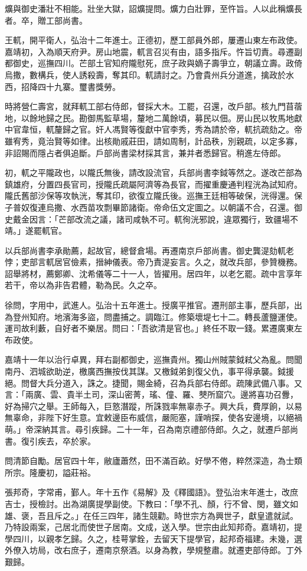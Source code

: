 \begin{pinyinscope}
爌與御史潘壯不相能。壯坐大獄，詔爌提問。爌力白壯罪，至忤旨。人以此稱爌長者。卒，贈工部尚書。

王軏，開平衛人，弘治十二年進士。正德初，歷工部員外郎，屢遷山東左布政使。嘉靖初，入為順天府尹。房山地震，軏言召災有由，語多指斥。忤旨切責。尋遷副都御史，巡撫四川。芒部土官知府隴慰死，庶子政與嫡子壽爭立，朝議立壽。政倚烏撒，數構兵，使人誘殺壽，奪其印。軏請討之。乃會貴州兵分道進，擒政於水西，招降四十九寨。璽書獎勞。

時將營仁壽宮，就拜軏工部右侍郎，督採大木。工罷，召還，改戶部。核九門苜蓿地，以餘地歸之民。勘御馬監草場，釐地二萬餘頃，募民以佃。房山民以牧馬地獻中官韋恒，軏釐歸之官。奸人馮賢等復獻中官李秀，秀為請於帝，軏抗疏劾之。帝雖宥秀，竟治賢等如律。出核勛戚莊田，請如周制，計品秩，別親疏，以定多寡，非詔賜而隱占者俱追斷。戶部尚書梁材採其言，兼并者悉歸官。稍進左侍郎。

初，軏之平隴政也，以隴氏無後，請改設流官，兵部尚書李鉞等然之。遂改芒部為鎮雄府，分置四長官司，授隴氏疏屬阿濟等為長官，而擢重慶通判程洸為試知府。隴氏舊部沙保等攻執洸，奪其印，欲復立隴氏後。巡撫王廷相等破保，洸得還。保子普奴復連烏撒、水西苗攻剽畢節諸衛。帝命伍文定圖之。以朝議不合，召還。御史戴金因言：「芒部改流之議，諸司咸執不可。軏徇洸邪說，違眾獨行，致疆場不靖。」遂罷軏官。

以兵部尚書李承勛薦，起故官，總督倉場。再遷南京戶部尚書。御史龔湜劾軏老悖；吏部言軏居官儉素，搢紳儀表。帝乃責湜妄言。久之，就改兵部，參贊機務。詔舉將材，薦鄭卿、沈希儀等二十一人，皆擢用。居四年，以老乞罷。疏中言享年若干，帝以為非告君體，勒為民。久之卒。

徐問，字用中，武進人。弘治十五年進士。授廣平推官。遷刑部主事，歷兵部，出為登州知府。地濱海多盜，問盡捕之。調臨江。修築壞堤七十二。轉長蘆鹽運使。運司故利藪，自好者不樂居。問曰：「吾欲清是官也。」終任不取一錢。累遷廣東左布政使。

嘉靖十一年以治行卓異，拜右副都御史，巡撫貴州。獨山州賊蒙鉞弒父為亂。問聞南丹、泗城欲助逆，檄廣西撫按伐其謀。又檄鉞弟釗復父仇，事平得承襲。鉞援絕。問督大兵分道入，誅之。捷聞，賜金綺，召為兵部右侍郎。疏陳武備八事。又言：「兩廣、雲、貴半土司，深山密菁，瑤、僮、羅、僰所窟穴。邊將喜功召釁，好為掃穴之舉。王師每入，巨憝潛蹤，所誅戮率無辜赤子。興大兵，費厚餉，以易無辜命，非陛下好生意。宜敕邊臣布威信，嚴阨塞，謹哨探，使各安邊境，以絕禍萌。」帝深納其言。尋引疾歸。二十一年，召為南京禮部侍郎。久之，就遷戶部尚書。復引疾去，卒於家。

問清節自勵。居官四十年，敝廬蕭然，田不滿百畝。好學不倦，粹然深造，為士類所宗。隆慶初，謚莊裕。

張邦奇，字常甫，鄞人。年十五作《易解》及《釋國語》。登弘治末年進士，改庶吉士，授檢討。出為湖廣提學副使。下教曰：「學不孔、顏，行不曾、閔，雖文如雄、褒，吾且斥之。」在任三四年，諸生競勸。時世宗方為興世子，獻皇遣就試。乃特設兩案，己居北而使世子居南。文成，送入學。世宗由此知邦奇。嘉靖初，提學四川，以親孝乞歸。久之，桂萼掌銓，去留天下提學官，起邦奇福建。未幾，選外僚入坊局，改右庶子，遷南京祭酒。以身為教，學規整肅。就遷吏部侍郎。丁外艱歸。


\end{pinyinscope}
